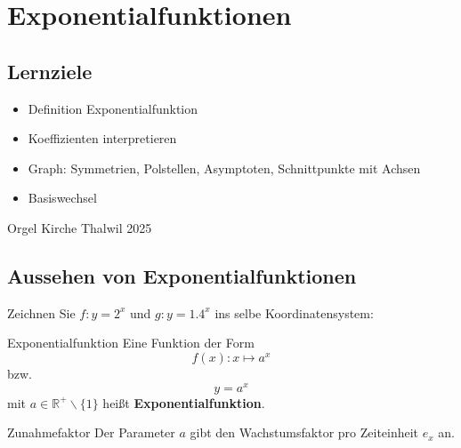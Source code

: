 
\section{Exponentialfunktionen}
\subsection*{Lernziele}

\begin{itemize}
\item Definition Exponentialfunktion
\item Koeffizienten interpretieren
\item Graph: Symmetrien, Polstellen, Asymptoten, Schnittpunkte mit Achsen
\item Basiswechsel
\end{itemize}

  \begin{center}{\tiny{Orgel Kirche Thalwil 2025}}\end{center}

\newpage

\subsection{Aussehen von Exponentialfunktionen}


Zeichnen Sie $f: y=2^x$ und $g: y=1.4^x$ ins selbe Koordinatensystem:



\begin{definition}{Exponentialfunktion}{}
  Eine Funktion der Form $$f(x): x \mapsto a^x$$
  bzw. $$y = a^x$$
  mit $a\in \mathbb{R}^{+}\backslash\{1\}$ heißt \textbf{Exponentialfunktion}.
\end{definition}


\begin{bemerkung}{Zunahmefaktor}{}
Der Parameter $a$ gibt den Wachstumsfaktor pro Zeiteinheit $e_x$ an.
\end{bemerkung}

